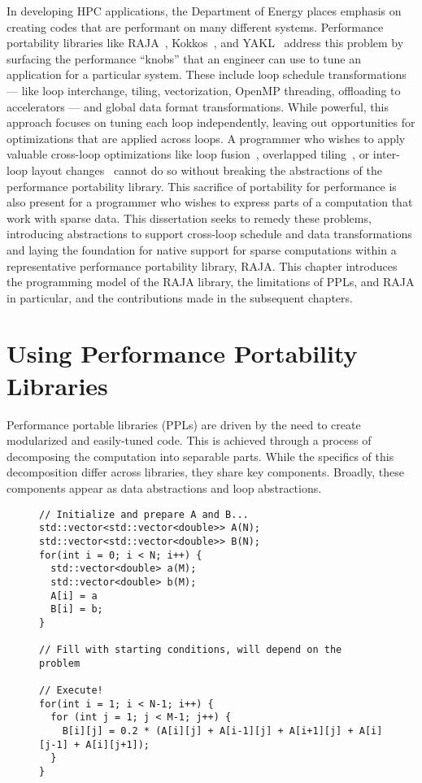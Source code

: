 In developing HPC applications, the Department of Energy places emphasis on creating codes that are performant on many different systems.
Performance portability libraries like RAJA~\cite{hornung2014RAJA}, Kokkos~\cite{edwards2014kokkos}, and YAKL~\cite{norman2022portable} address this problem by surfacing the performance ``knobs'' that an engineer can use to tune an application for a particular system. 
These include loop schedule transformations --- like loop interchange, tiling, vectorization, OpenMP threading, offloading to accelerators --- and global data format transformations.
While powerful, this approach focuses on tuning each loop independently, leaving out opportunities for optimizations that are applied across loops.
A programmer who wishes to apply valuable cross-loop optimizations like loop fusion~\cite{mckinley1996improving}, overlapped tiling~\cite{bertolacci2019using,zhou2012hierarchical,CathieSC14}, or inter-loop layout changes~\cite{kennedy1995automatic,kennedy1998automatic} cannot do so without breaking the abstractions of the performance portability library.
This sacrifice of portability for performance is also present for a programmer who wishes to express parts of a computation that work with sparse data.
This dissertation seeks to remedy these problems, introducing abstractions to support cross-loop schedule and data transformations and laying the foundation for native support for sparse computations within a representative performance portability library, RAJA\@.
This chapter introduces the programming model of the RAJA library, the limitations of PPLs, and RAJA in particular, and the contributions made in the subsequent chapters. 

\section{Using Performance Portability Libraries}

Performance portable libraries (PPLs) are driven by the need to create modularized and easily-tuned code.
This is achieved through a process of decomposing the computation into separable parts.
While the specifics of this decomposition differ across libraries, they share key components.
Broadly, these components appear as data abstractions and loop abstractions.

\begin{figure}[h]
\begin{lstlisting}[caption={C++ reference implementation of a 5-point stencil computation.},label=stencilCpp]
// Initialize and prepare A and B...
std::vector<std::vector<double>> A(N);
std::vector<std::vector<double>> B(N);
for(int i = 0; i < N; i++) {
  std::vector<double> a(M);
  std::vector<double> b(M);
  A[i] = a
  B[i] = b;
}

// Fill with starting conditions, will depend on the problem

// Execute!
for(int i = 1; i < N-1; i++) {
  for (int j = 1; j < M-1; j++) {
    B[i][j] = 0.2 * (A[i][j] + A[i-1][j] + A[i+1][j] + A[i][j-1] + A[i][j+1]);
  }
}
\end{lstlisting}
\end{figure}

